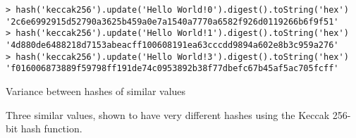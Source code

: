 \begin{listing}[H]
  \centering
  \begin{verbatim}
> hash('keccak256').update('Hello World!0').digest().toString('hex')
'2c6e6992915d52790a3625b459a0e7a1540a7770a6582f926d0119266b6f9f51'
> hash('keccak256').update('Hello World!1').digest().toString('hex')
'4d880de6488218d7153abeacff100608191ea63cccdd9894a602e8b3c959a276'
> hash('keccak256').update('Hello World!3').digest().toString('hex')
'f016006873889f59798ff191de74c0953892b38f77dbefc67b45af5ac705fcff'
  \end{verbatim}
  \caption{
    Variance between hashes of similar values
  }{
    Three similar values, shown to have very different hashes using the Keccak 256-bit hash function.
  }
  \label{code:example_keccak_unpredictability}
\end{listing}
